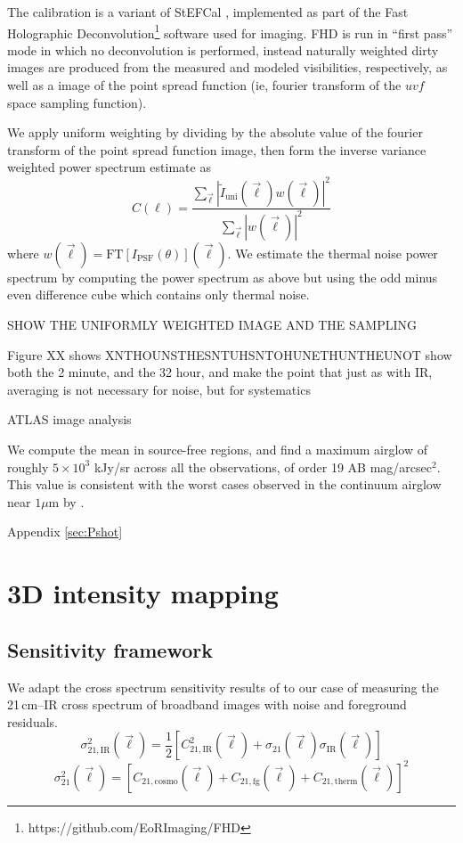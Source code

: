 \documentclass[preprint]{aastex}
\newcommand{\IR}{\text{IR}}
\newcommand{\therm}{\text{therm}}
\newcommand{\cosmo}{\text{cosmo}}
\newcommand{\fg}{\text{fg}}
\begin{document}
The calibration is a variant of StEFCal \citep{stefcal}, implemented as part of the Fast Holographic Deconvolution\footnote{https://github.com/EoRImaging/FHD} \citep{fhd} software used for imaging. FHD is run in ``first pass'' mode in which no deconvolution is performed, instead naturally weighted dirty images are produced from the measured and modeled visibilities, respectively, as well as a image of the point spread function (ie, fourier transform of the $uvf$ space sampling function). 

We apply uniform weighting by dividing by the absolute value of the fourier transform of the point spread function image, then form the inverse variance weighted power spectrum estimate as
\begin{equation}
	C(\ell)=\frac{\sum_{\vec{\ell}}|\tilde{I}_\text{uni}(\vec{\ell})w(\vec{\ell})|^2}{\sum_{\vec{\ell}}|w(\vec{\ell})|^2}
\end{equation}
where $w(\vec{\ell})=\text{FT}[I_\text{PSF}(\theta)](\vec{\ell})$. We estimate the thermal noise power spectrum by computing the power spectrum as above but using the odd minus even difference cube which contains only thermal noise.

SHOW THE UNIFORMLY WEIGHTED IMAGE AND THE SAMPLING

Figure XX shows XNTHOUNSTHESNTUHSNTOHUNETHUNTHEUNOT
	show both the 2 minute, and the 32 hour, and make the point that just as with IR, averaging is not necessary for noise, but for systematics



ATLAS image analysis



We compute the mean in source-free regions, and find a maximum airglow of roughly $5\times10^3$ kJy/sr across all the observations, of order 19 AB mag/arcsec$^2$. This value is consistent with the worst cases observed in the continuum airglow near $1\mu$m by \citet{sullivan12}.

Appendix \ref{sec:Pshot}


\section{3D intensity mapping}

\subsection{Sensitivity framework}
We adapt the cross spectrum sensitivity results of \citet{lidz09} to our case of measuring the 21\,cm--IR cross spectrum of broadband images with noise and foreground residuals. 
\begin{equation}
\label{eqn:sense1}
	\sigma_{21,\IR}^2(\vec{\ell})=\frac{1}{2}[C^2_{21,\IR}(\vec{\ell})+\sigma_{21}(\vec{\ell})\sigma_{\IR}(\vec{\ell})]
\end{equation}
\begin{equation}
\label{eqn:sense2}
	\sigma_{21}^2(\vec{\ell})=[C_{21,\cosmo}(\vec{\ell})+C_{21,\fg}(\vec{\ell})+C_{21,\therm}(\vec{\ell})]^2
\end{equation}
\end{document}
